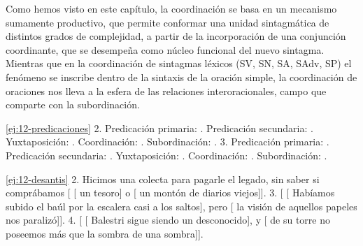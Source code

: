 \begin{recuadro}
Como hemos visto en este capítulo, la coordinación se basa en un mecanismo
sumamente productivo, que permite conformar una unidad sintagmática de distintos
grados de complejidad, a partir de la incorporación de una conjunción
coordinante, que se desempeña como núcleo funcional del nuevo sintagma. Mientras
que en la coordinación de sintagmas léxicos (SV, SN, SA, SAdv, SP) el fenómeno se
inscribe dentro de la sintaxis de la oración simple, la coordinación de oraciones
nos lleva a la esfera de las relaciones interoracionales, campo que comparte con
la subordinación.
\end{recuadro}

\lecturasrecomendadas

\solucionario

\begin{solucion}{\ref{ej:12-predicaciones}}
2. Predicación primaria: . Predicación
secundaria: . Yuxtaposición:
. Coordinación:
. Subordinación:
. 3.
Predicación primaria: . Predicación secundaria:
. Yuxtaposición: . Coordinación: . Subordinación: .
\end{solucion}

\begin{solucion}{\ref{ej:12-desantis}}
2. Hicimos una colecta para pagarle el legado, sin saber si comprábamos
[ [ un tesoro] o [ un
montón de diarios viejos]]. 3. [ [ Habíamos subido el
baúl por la escalera casi a los saltos], pero [ la
visión de aquellos papeles nos paralizó]]. 4. [ [
Balestri sigue siendo un desconocido], y [ de su torre
no poseemos más que la sombra de una sombra]].
\end{solucion}

